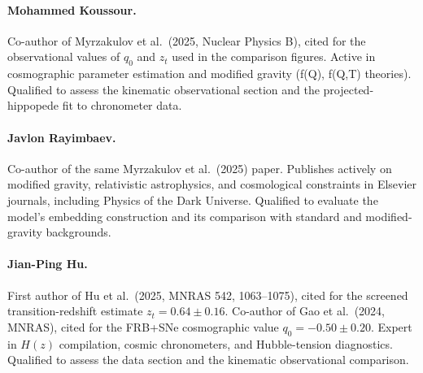 \documentclass[11pt,a4paper]{article}
\begin{document}
\paragraph{Mohammed Koussour.}
Co-author of Myrzakulov et al.\ (2025, Nuclear Physics B), cited for
the observational values of $q_0$ and $z_t$ used in the comparison
figures. Active in cosmographic parameter estimation and modified gravity
(f(Q), f(Q,T) theories). Qualified to assess the kinematic observational
section and the projected-hippopede fit to chronometer data.

\paragraph{Javlon Rayimbaev.}
Co-author of the same Myrzakulov et al.\ (2025) paper. Publishes
actively on modified gravity, relativistic astrophysics, and cosmological
constraints in Elsevier journals, including Physics of the Dark Universe.
Qualified to evaluate the model's embedding construction and its
comparison with standard and modified-gravity backgrounds.

\paragraph{Jian-Ping Hu.}
First author of Hu et al.\ (2025, MNRAS 542, 1063--1075), cited for
the screened transition-redshift estimate $z_t = 0.64\pm0.16$.
Co-author of Gao et al.\ (2024, MNRAS), cited for the FRB+SNe
cosmographic value $q_0=-0.50\pm0.20$. Expert in $H(z)$ compilation,
cosmic chronometers, and Hubble-tension diagnostics. Qualified to
assess the data section and the kinematic observational comparison.
\end{document}
